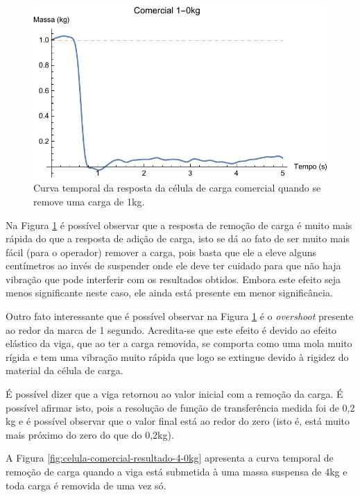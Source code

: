 \documentclass[a4paper]{instrumentacao}
\begin{document}
\begin{figure}[H]
\center
\includegraphics[width=\textwidth]{Comercial_1-0kg.pdf}
\caption{Curva temporal da resposta da célula de carga comercial quando se remove uma carga de 1kg.}
\label{fig:celula-comercial-resultado-1-0kg}
\end{figure}

Na Figura \ref{fig:celula-comercial-resultado-1-0kg} é possível observar que a resposta de remoção de carga é muito mais rápida do que a resposta de adição de carga, isto se dá ao fato de ser muito mais fácil (para o operador) remover a carga, pois basta que ele a eleve alguns centímetros ao invés de suspender onde ele deve ter cuidado para que não haja vibração que pode interferir com os resultados obtidos. Embora este efeito seja menos significante neste caso, ele ainda está presente em menor significância.

Outro fato interessante que é possível observar na Figura \ref{fig:celula-comercial-resultado-1-0kg} é o \textit{overshoot} presente ao redor da marca de 1 segundo. Acredita-se que este efeito é devido ao efeito elástico da viga, que ao ter a carga removida, se comporta como uma mola muito rígida e tem uma vibração muito rápida que logo se extingue devido à rigidez do material da célula de carga.

É possível dizer que a viga retornou ao valor inicial com a remoção da carga. É possível afirmar isto, pois a resolução de função de transferência medida foi de 0,2 kg e é possível observar que o valor final está ao redor do zero (isto é, está muito mais próximo do zero do que do 0,2kg).

A Figura \ref{fig:celula-comercial-resultado-4-0kg} apresenta a curva temporal de remoção de carga quando a viga está submetida à uma massa suspensa de 4kg e toda carga é removida de uma vez só.
\end{document}
